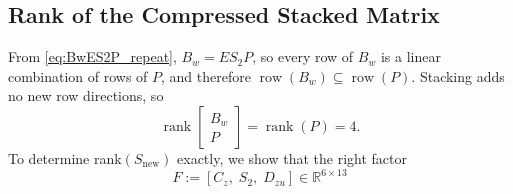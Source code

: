 \documentclass[11pt]{article}
\newcommand{\R}{\mathbb{R}}
\newcommand{\rank}{\operatorname{rank}}
\begin{document}
\subsection{Rank of the Compressed Stacked Matrix}
From \eqref{eq:BwES2P_repeat}, $B_w = ES_2P$, so every row of $B_w$ is a 
linear combination of rows of $P$, and therefore $\operatorname{row}(B_w) 
\subseteq \operatorname{row}(P)$. Stacking adds no new row directions, so
\begin{equation}
    \rank\!\begin{bmatrix} B_w \\ P \end{bmatrix} = \rank(P) = 4.
    \label{eq:rankBwP}
\end{equation}
To determine rank$(S_\text{new})$ exactly, we show that the right factor
\begin{equation}
    F := [C_z,\; S_2,\; D_{zu}] \in \R^{6\times 13}
    \label{eq:Fdef}
\end{equation}
\end{document}
